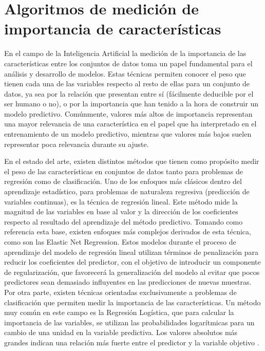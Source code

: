 \documentclass{uathesis-es}
\begin{document}
\section{Algoritmos de medición de importancia de características}
\label{SOAT_FEATURE_IMPORTANCE_METHODS}

En el campo de la Inteligencia Artificial la medición de la importancia de las características entre los conjuntos de datos toma un papel fundamental para el análisis y desarrollo de modelos. Estas técnicas permiten conocer el peso que tienen cada una de las variables respecto al resto de ellas para un conjunto de datos, ya sea por la relación que presentan entre sí (fácilmente deducible por el ser humano o no), o por la importancia que han tenido a la hora de construir un modelo predictivo. Comúnmente, valores más altos de importancia representan una mayor relevancia de una característica  en el papel que ha interpretado en el entrenamiento de un modelo predictivo, mientras que valores más bajos suelen representar poca relevancia durante su ajuste.

En el estado del arte, existen distintos métodos que tienen como propósito medir el peso de las características en conjuntos de datos tanto para problemas de regresión como de clasificación. Uno de los enfoques más clásicos dentro del aprendizaje estadístico, para problemas de naturaleza regresiva (predicción de variables continuas), es la técnica de regresión lineal. Este método mide la magnitud de las variables en base al valor y la dirección de los coeficientes respecto al resultado del aprendizaje del método predictivo. Tomando como referencia esta base, existen enfoques más complejos derivados de esta técnica, como son las Elastic Net Regression. Estos modelos durante el proceso de aprendizaje del modelo de regresión lineal utilizan términos de penalización para reducir los coeficientes del predictor, con el objetivo de introducir un componente de regularización, que favorecerá la generalización del modelo al evitar que pocos predictores sean demasiado influyentes en las predicciones de nuevas muestras. Por otra parte, existen técnicas orientadas exclusivamente a problemas de clasificación que permiten medir la importancia de las características. Un método muy común en este campo es la Regresión Logística, que para calcular la importancia de las variables, se utilizan las probabilidades logarítmicas para un cambio de una unidad en la variable predictiva. Los valores absolutos más grandes indican una relación más fuerte entre el predictor y la variable objetivo \cite{Saarela2021}.
\end{document}
